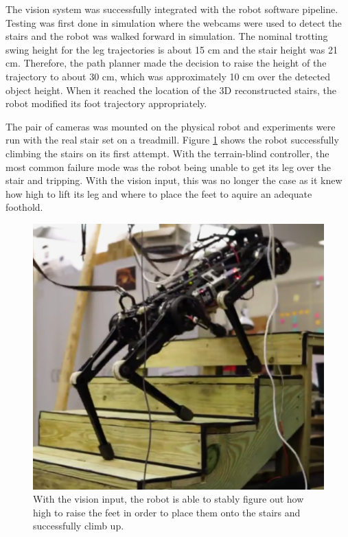 The vision system was successfully integrated with the robot software pipeline. Testing was first done in simulation where the webcams were used to detect the stairs and the robot was walked forward in simulation. The nominal trotting swing height for the leg trajectories is about 15 cm and the stair height was 21 cm. Therefore, the path planner made the decision to raise the height of the trajectory to about 30 cm, which was approximately 10 cm over the detected object height. When it reached the location of the 3D reconstructed stairs, the robot modified its foot trajectory appropriately. 

The pair of cameras was mounted on the physical robot and experiments were run with the real stair set on a treadmill. Figure \ref{fig:RS} shows the robot successfully climbing the stairs on its first attempt. With the terrain-blind controller, the most common failure mode was the robot being unable to get its leg over the stair and tripping. With the vision input, this was no longer the case as it knew how high to lift its leg and where to place the feet to aquire an adequate foothold.
\begin{figure}[!h]
\centering
\includegraphics[width=0.85\columnwidth]{Figures/RobotStairs.pdf}
\caption{With the vision input, the robot is able to stably figure out how high to raise the feet in order to place them onto the stairs and successfully climb up.}
\label{fig:RS}
\end{figure}